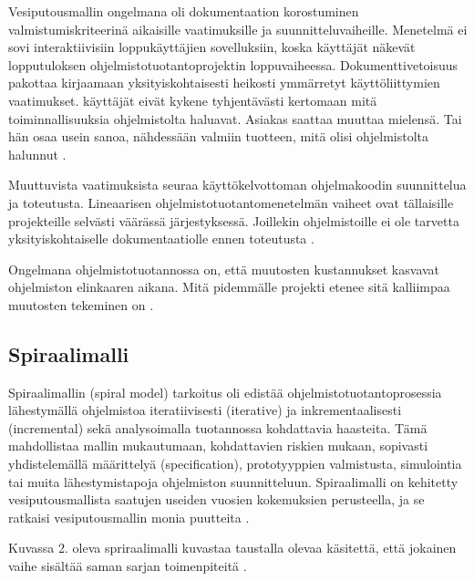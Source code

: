 \documentclass[finnish]{tktltiki2}
\theoremstyle{definition}
\theoremstyle{remark}
\begin{document}
Vesiputousmallin ongelmana oli dokumentaation korostuminen valmistumiskriteerinä aikaisille vaatimuksille ja suunnitteluvaiheille. Menetelmä ei sovi interaktiivisiin loppukäyttäjien sovelluksiin, koska käyttäjät näkevät lopputuloksen ohjelmistotuotantoprojektin loppuvaiheessa. Dokumenttivetoisuus pakottaa kirjaamaan yksityiskohtaisesti heikosti ymmärretyt käyttöliittymien vaatimukset. käyttäjät eivät kykene tyhjentävästi kertomaan mitä toiminnallisuuksia ohjelmistolta haluavat. Asiakas saattaa muuttaa mielensä. Tai hän osaa usein sanoa, nähdessään valmiin tuotteen, mitä olisi ohjelmistolta halunnut \cite{BEC99}.

Muuttuvista vaatimuksista seuraa käyttökelvottoman ohjelmakoodin suunnittelua ja toteutusta. Lineaarisen ohjelmistotuotantomenetelmän vaiheet ovat tällaisille projekteille selvästi väärässä järjestyksessä. Joillekin ohjelmistoille ei ole tarvetta yksityiskohtaiselle dokumentaatiolle ennen toteutusta \cite{BOE88}.

Ongelmana ohjelmistotuotannossa on, että muutosten kustannukset kasvavat ohjelmiston elinkaaren aikana. Mitä pidemmälle projekti etenee sitä kalliimpaa muutosten tekeminen on \cite{HIC01}.


\subsection{Spiraalimalli}

Spiraalimallin (spiral model) tarkoitus oli edistää ohjelmistotuotantoprosessia lähestymällä ohjelmistoa iteratiivisesti (iterative) ja inkrementaalisesti (incremental) sekä analysoimalla tuotannossa kohdattavia haasteita. Tämä mahdollistaa mallin mukautumaan, kohdattavien riskien mukaan, sopivasti yhdistelemällä määrittelyä (specification), prototyyppien valmistusta, simulointia tai muita lähestymistapoja ohjelmiston suunnitteluun. Spiraalimalli on kehitetty vesiputousmallista saatujen useiden vuosien kokemuksien perusteella, ja se ratkaisi vesiputousmallin monia puutteita \cite{BOE88}.


Kuvassa 2. oleva spriraalimalli kuvastaa taustalla olevaa käsitettä, että jokainen vaihe sisältää saman sarjan toimenpiteitä \cite{BOE88}.
\end{document}
